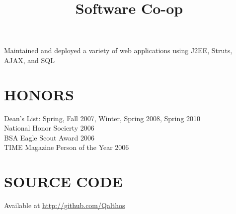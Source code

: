 \documentclass[line]{res}
\begin{document}
\begin{resume}
    \title{Software Co-op}
    \begin{position}
        Maintained and deployed a variety of web applications using J2EE,
        Struts, AJAX, and SQL
    \end{position}

\section{HONORS}
    Dean's List: Spring, Fall 2007, Winter, Spring 2008, Spring 2010 \\
    National Honor Socierty 2006 \\
    BSA Eagle Scout Award 2006 \\
    TIME Magazine Person of the Year 2006 \\

\section{SOURCE CODE}
    Available at \url{http://github.com/Qalthos}\\

\end{resume}
\end{document}
